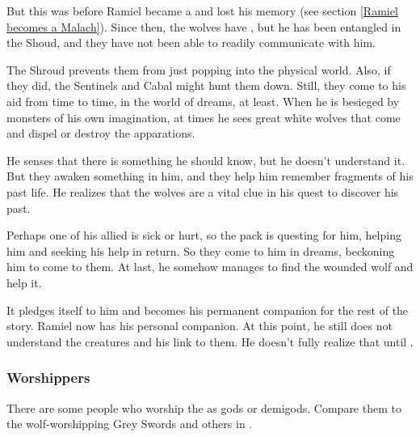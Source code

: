 But this was before Ramiel became a \Malach{} and lost his memory (see section \ref{Ramiel becomes a Malach}). Since then, the wolves have , but he has been entangled in the Shoud, and they have not been able to readily communicate with him. 

The Shroud prevents them from just popping into the physical world. Also, if they did, the Sentinels and Cabal might hunt them down. Still, they come to his aid from time to time, in the world of dreams, at least. When he is besieged by monsters of his own imagination, at times he sees great white wolves that come and dispel or destroy the apparations. 

He senses that there is something he should know, but he doesn't understand it. But they awaken something in him, and they help him remember fragments of his past life. He realizes that the wolves are a vital clue in his quest to discover his past.

Perhaps one of his allied \moonwolves{} is sick or hurt, so the pack is questing for him, helping him and seeking his help in return. So they come to him in dreams, beckoning him to come to them. At last, he somehow manages to find the wounded wolf and help it. 

It pledges itself to him and becomes his permanent companion for the rest of the story. Ramiel now has his personal \moonwolf{} companion. At this point, he still does not understand the creatures and his link to them. He doesn't fully realize that until . 





\subsubsection{Worshippers}
There are some people who worship the \moonwolves{} as gods or demigods. Compare them to the wolf-worshipping Grey Swords and others in \cite{StevenEriksonIanCameronEsslemont:MalazanBookoftheFallen}.
























